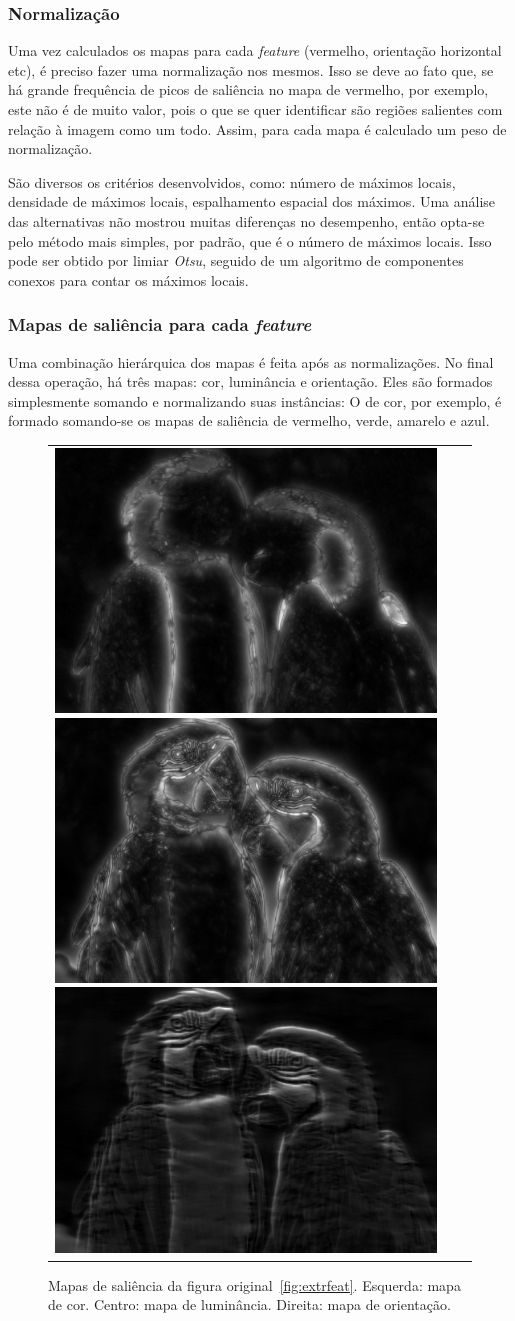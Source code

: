 \documentclass[11pt]{article}
\newcommand{\tit}[1]{\textit{#1}}
\begin{document}
\subsubsection{Normalização}
Uma vez calculados os mapas para cada \tit{feature} (vermelho,
orientação horizontal etc), é preciso fazer uma normalização nos mesmos.
Isso se deve ao fato que, se há grande frequência de picos de saliência
no mapa de vermelho, por exemplo, este não é de muito valor, pois o que se
quer identificar são regiões salientes com relação à imagem como um todo.
Assim, para cada mapa é calculado um peso de normalização.

São diversos os critérios desenvolvidos, como: número de máximos locais,
densidade de máximos locais, espalhamento espacial dos máximos.
Uma análise das alternativas não mostrou muitas diferenças no desempenho,
então opta-se pelo método mais simples, por padrão, que é o número de máximos
locais. Isso pode ser obtido por limiar \tit{Otsu}, seguido de um algoritmo
de componentes conexos para contar os máximos locais.

\subsubsection{Mapas de saliência para cada \tit{feature}}
Uma combinação hierárquica dos mapas é feita após as normalizações.
No final dessa operação, há três mapas: cor, luminância
e orientação.
Eles são formados simplesmente somando e normalizando suas instâncias:
O de cor, por exemplo, é formado somando-se os mapas de saliência de
vermelho, verde, amarelo e azul.
\begin{figure}[H]
\begin{center}
		\begin{tabular} {ccc}
            \includegraphics[width=0.3\linewidth]{img/arara_col_map.png}
            \includegraphics[width=0.3\linewidth]{img/arara_cst_map.png}
            \includegraphics[width=0.3\linewidth]{img/arara_ort_map.png}
		\end{tabular}
\end{center}
\caption{Mapas de saliência da figura original~\ref{fig:extrfeat}.
    Esquerda: mapa de cor. Centro: mapa de luminância. Direita: mapa de
orientação.}
\label{fig:maps}
\end{figure}
\end{document}
